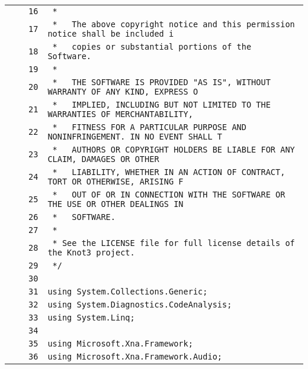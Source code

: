 \documentclass[a4paper,10pt]{article}
\begin{document}
\begin{longtable}[l]{lrrl}
\cellcolor{gray} &  & \verb~16~ & \verb~ *~\\
\cellcolor{gray} &  & \verb~17~ & \verb~ *   The above copyright notice and this permission notice shall be included i~\\
\cellcolor{gray} &  & \verb~18~ & \verb~ *   copies or substantial portions of the Software.~\\
\cellcolor{gray} &  & \verb~19~ & \verb~ *~\\
\cellcolor{gray} &  & \verb~20~ & \verb~ *   THE SOFTWARE IS PROVIDED "AS IS", WITHOUT WARRANTY OF ANY KIND, EXPRESS O~\\
\cellcolor{gray} &  & \verb~21~ & \verb~ *   IMPLIED, INCLUDING BUT NOT LIMITED TO THE WARRANTIES OF MERCHANTABILITY,~\\
\cellcolor{gray} &  & \verb~22~ & \verb~ *   FITNESS FOR A PARTICULAR PURPOSE AND NONINFRINGEMENT. IN NO EVENT SHALL T~\\
\cellcolor{gray} &  & \verb~23~ & \verb~ *   AUTHORS OR COPYRIGHT HOLDERS BE LIABLE FOR ANY CLAIM, DAMAGES OR OTHER~\\
\cellcolor{gray} &  & \verb~24~ & \verb~ *   LIABILITY, WHETHER IN AN ACTION OF CONTRACT, TORT OR OTHERWISE, ARISING F~\\
\cellcolor{gray} &  & \verb~25~ & \verb~ *   OUT OF OR IN CONNECTION WITH THE SOFTWARE OR THE USE OR OTHER DEALINGS IN~\\
\cellcolor{gray} &  & \verb~26~ & \verb~ *   SOFTWARE.~\\
\cellcolor{gray} &  & \verb~27~ & \verb~ *~\\
\cellcolor{gray} &  & \verb~28~ & \verb~ * See the LICENSE file for full license details of the Knot3 project.~\\
\cellcolor{gray} &  & \verb~29~ & \verb~ */~\\
\cellcolor{gray} &  & \verb~30~ & \verb~~\\
\cellcolor{gray} &  & \verb~31~ & \verb~using System.Collections.Generic;~\\
\cellcolor{gray} &  & \verb~32~ & \verb~using System.Diagnostics.CodeAnalysis;~\\
\cellcolor{gray} &  & \verb~33~ & \verb~using System.Linq;~\\
\cellcolor{gray} &  & \verb~34~ & \verb~~\\
\cellcolor{gray} &  & \verb~35~ & \verb~using Microsoft.Xna.Framework;~\\
\cellcolor{gray} &  & \verb~36~ & \verb~using Microsoft.Xna.Framework.Audio;~\\

\end{longtable}
\end{document}
